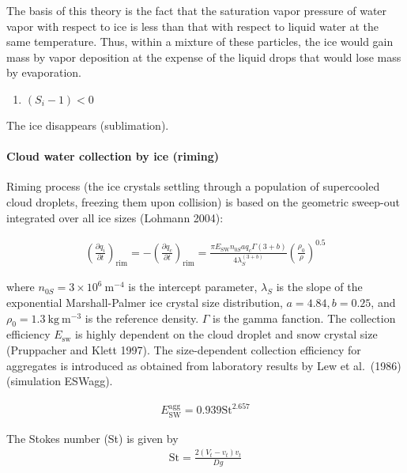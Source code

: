 The basis of this theory is the fact that the saturation vapor pressure
of water vapor with respect to ice is less than that with respect to
liquid water at the same temperature. Thus, within a mixture of these
particles, the ice would gain mass by vapor deposition at the expense of
the liquid drops that would lose mass by evaporation.

\begin{enumerate}
\def\labelenumi{\arabic{enumi}.}
\setcounter{enumi}{1}
\tightlist
\item
  \((S_i - 1)<0\)
\end{enumerate}

The ice disappears (sublimation).

\hypertarget{cloud-water-collection-by-ice-riming}{%
\paragraph{Cloud water collection by ice
(riming)}\label{cloud-water-collection-by-ice-riming}}

Riming process (the ice crystals settling through a population of
supercooled cloud droplets, freezing them upon collision) is based on
the geometric sweep-out integrated over all ice sizes (Lohmann 2004):

\begin{eqnarray}
\left(\frac{\partial q_i}{\partial t}\right)_{\text {rim}}
=-\left(\frac{\partial q_c}{\partial t}\right)_{\text {rim}}
=\frac{\pi E_{\mathrm{SW}} n_{0S} a q_{c} \Gamma(3+b)}{4 \lambda_{S}^{(3+b)}}\left(\frac{\rho_{0}}{\rho}\right)^{0.5}
\end{eqnarray}

where \(n_{0 S}=3 \times 10^{6} \mathrm{~m}^{-4}\) is the intercept
parameter, \(\lambda_{S}\) is the slope of the exponential
Marshall-Palmer ice crystal size distribution, \(a=4.84, b=0.25\), and
\(\rho_{0}=1.3 \mathrm{~kg} \mathrm{~m}^{-3}\) is the reference density.
\(\Gamma\) is the gamma fanction. The collection efficiency
\(E_{\mathrm{sw}}\) is highly dependent on the cloud droplet and snow
crystal size (Pruppacher and Klett 1997). The size-dependent collection
efficiency for aggregates is introduced as obtained from laboratory
results by Lew et al.~(1986) (simulation ESWagg).

\begin{eqnarray}
E_{\mathrm{SW}}^{\mathrm{agg}}=0.939 \mathrm{St}^{2.657}
\end{eqnarray}

The Stokes number (St) is given by \begin{eqnarray}
\mathrm{St}=\frac{2\left(V_{t}-{v}_{t}\right) {v}_{t}}{D g}
\end{eqnarray}

